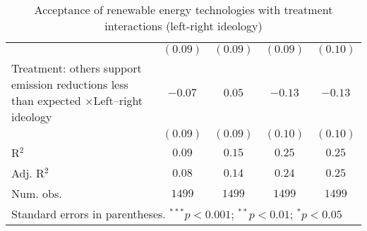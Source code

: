 \begin{table}[h]
\begin{center}
\begin{tabular}{l c c c c}
                                                                                                             & $(0.09)$      & $(0.09)$      & $(0.09)$      & $(0.10)$      \\
\shortstack{Treatment: others support\\emission reductions\\less than expected\\$\times$Left–right ideology} & $-0.07$       & $0.05$        & $-0.13$       & $-0.13$       \\
                                                                                                             & $(0.09)$      & $(0.09)$      & $(0.10)$      & $(0.10)$      \\
\hline
R$^2$                                                                                                        & $0.09$        & $0.15$        & $0.25$        & $0.25$        \\
Adj. R$^2$                                                                                                   & $0.08$        & $0.14$        & $0.24$        & $0.25$        \\
Num. obs.                                                                                                    & $1499$        & $1499$        & $1499$        & $1499$        \\
\hline
\multicolumn{5}{l}{\scriptsize{Standard errors in parentheses. $^{***}p<0.001$; $^{**}p<0.01$; $^{*}p<0.05$}}
\end{tabular}
\caption{Acceptance of renewable energy technologies with treatment interactions (left-right ideology)}
\label{table:acceptance_interactions_left_right}
\end{center}
\end{table}
